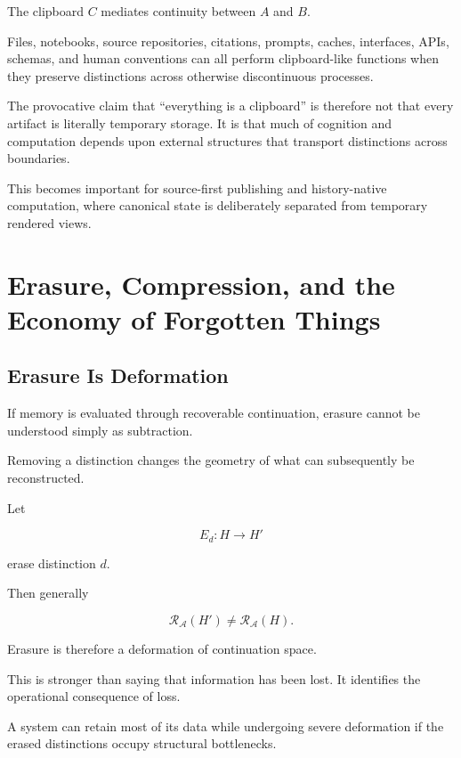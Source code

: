 \documentclass[11pt]{article}
\theoremstyle{remark}
\newcommand{\Adm}{\mathcal{A}}
\newcommand{\Reach}{\mathcal{R}}
\begin{document}
The clipboard $C$ mediates continuity between $A$ and $B$.

Files, notebooks, source repositories, citations, prompts, caches, interfaces, APIs, schemas, and human conventions can all perform clipboard-like functions when they preserve distinctions across otherwise discontinuous processes.

The provocative claim that ``everything is a clipboard'' is therefore not that every artifact is literally temporary storage. It is that much of cognition and computation depends upon external structures that transport distinctions across boundaries.

This becomes important for source-first publishing and history-native computation, where canonical state is deliberately separated from temporary rendered views.

\section{Erasure, Compression, and the Economy of Forgotten Things}

\subsection{Erasure Is Deformation}

If memory is evaluated through recoverable continuation, erasure cannot be understood simply as subtraction.

Removing a distinction changes the geometry of what can subsequently be reconstructed.

Let

\begin{equation}
E_d:H\rightarrow H'
\end{equation}

erase distinction $d$.

Then generally

\begin{equation}
\Reach_{\Adm}(H')
\neq
\Reach_{\Adm}(H).
\end{equation}

Erasure is therefore a deformation of continuation space.

This is stronger than saying that information has been lost. It identifies the operational consequence of loss.

A system can retain most of its data while undergoing severe deformation if the erased distinctions occupy structural bottlenecks.
\end{document}
